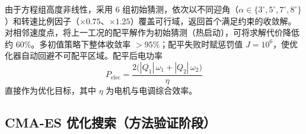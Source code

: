 由于方程组高度非线性，采用 6 组初始猜测，依次以不同迎角（$\alpha \in \{3^\circ, 5^\circ, 7^\circ, 8^\circ\}$）和转速比例因子（$\times 0.75$、$\times 1.25$）覆盖可行域，返回首个满足约束的收敛解。对相邻速度点，将上一工况的配平解作为初始猜测（热启动），可将求解代价降低约 60\%。多初值策略下整体收敛率 $>95\%$；配平失败时赋惩罚值 $J = 10^6$，使优化器自动回避不可配平区域。配平后电功率
\begin{equation}
P_\text{elec} = \frac{2\bigl(|Q_1|\,\omega_1 + |Q_2|\,\omega_2\bigr)}{\eta}
\end{equation}
直接作为优化目标，其中 $\eta$ 为电机与电调综合效率。


\subsection{CMA-ES 优化搜索（方法验证阶段）}

